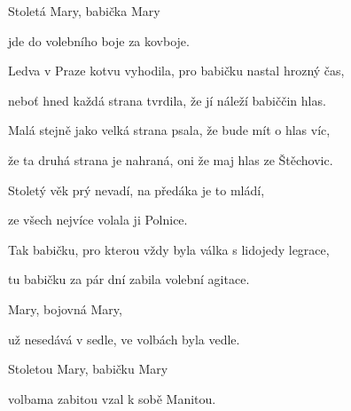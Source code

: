 Stoletá Mary, babička Mary 

jde do volebního boje za kovboje. 
\kr

\zs
Ledva v Praze kotvu vyhodila, pro babičku nastal hrozný čas, 

neboť hned každá strana tvrdila, že jí náleží babiččin hlas. 

\bigskip

Malá stejně jako velká strana psala, že bude mít o hlas víc, 

že ta druhá strana je nahraná, oni že maj hlas ze Štěchovic. 

\bigskip

Stoletý věk prý nevadí, na předáka je to mládí, 

ze všech nejvíce volala ji Polnice. 

\bigskip

Tak babičku, pro kterou vždy byla válka s lidojedy legrace, 

tu babičku za pár dní zabila volební agitace. 
\ks

\zr
Mary, bojovná Mary, 

už nesedává v sedle, ve volbách byla vedle. 

Stoletou Mary, babičku Mary 

volbama zabitou vzal k sobě Manitou.
\kr
\kp

